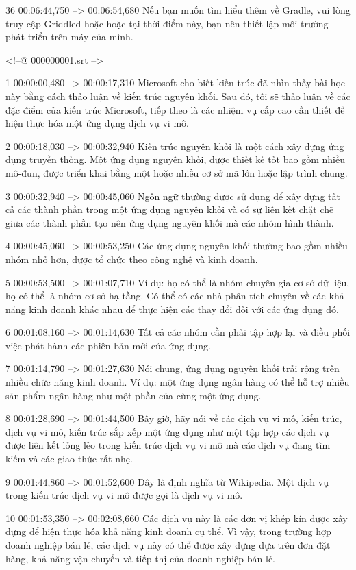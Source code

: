36
00:06:44,750 --> 00:06:54,680
Nếu bạn muốn tìm hiểu thêm về Gradle, vui lòng truy cập Griddled hoặc hoặc tại thời điểm này, bạn nên thiết lập môi trường phát triển trên máy của mình.

<!--@ 000000001.srt -->

1
00:00:00,480 --> 00:00:17,310
Microsoft cho biết kiến ​​trúc đã nhìn thấy bài học này bằng cách thảo luận về kiến ​​trúc nguyên khối.  Sau đó, tôi sẽ thảo luận về các đặc điểm của kiến ​​trúc Microsoft, tiếp theo là các nhiệm vụ cấp cao cần thiết để hiện thực hóa một ứng dụng dịch vụ vi mô.

2
00:00:18,030 --> 00:00:32,940
Kiến trúc nguyên khối là một cách xây dựng ứng dụng truyền thống.  Một ứng dụng nguyên khối, được thiết kế tốt bao gồm nhiều mô-đun, được triển khai bằng một hoặc nhiều cơ sở mã lớn hoặc lập trình chung.

3
00:00:32,940 --> 00:00:45,060
Ngôn ngữ thường được sử dụng để xây dựng tất cả các thành phần trong một ứng dụng nguyên khối và có sự liên kết chặt chẽ giữa các thành phần tạo nên ứng dụng nguyên khối mà các nhóm hình thành.

4
00:00:45,060 --> 00:00:53,250
Các ứng dụng nguyên khối thường bao gồm nhiều nhóm nhỏ hơn, được tổ chức theo công nghệ và kinh doanh.

5
00:00:53,500 --> 00:01:07,710
Ví dụ: họ có thể là nhóm chuyên gia cơ sở dữ liệu, họ có thể là nhóm cơ sở hạ tầng.
Có thể có các nhà phân tích chuyên về các khả năng kinh doanh khác nhau để thực hiện các thay đổi đối với các ứng dụng đó.

6
00:01:08,160 --> 00:01:14,630
Tất cả các nhóm cần phải tập hợp lại và điều phối việc phát hành các phiên bản mới của ứng dụng.

7
00:01:14,790 --> 00:01:27,630
Nói chung, ứng dụng nguyên khối trải rộng trên nhiều chức năng kinh doanh.  Ví dụ: một ứng dụng ngân hàng có thể hỗ trợ nhiều sản phẩm ngân hàng như một phần của cùng một ứng dụng.

8
00:01:28,690 --> 00:01:44,500
Bây giờ, hãy nói về các dịch vụ vi mô, kiến ​​trúc, dịch vụ vi mô, kiến ​​trúc sắp xếp một ứng dụng như một tập hợp các dịch vụ được liên kết lỏng lẻo trong kiến ​​trúc dịch vụ vi mô mà các dịch vụ đang tìm kiếm và các giao thức rất nhẹ.

9
00:01:44,860 --> 00:01:52,600
Đây là định nghĩa từ Wikipedia.  Một dịch vụ trong kiến ​​trúc dịch vụ vi mô được gọi là dịch vụ vi mô.

10
00:01:53,350 --> 00:02:08,660
Các dịch vụ này là các đơn vị khép kín được xây dựng để hiện thực hóa khả năng kinh doanh cụ thể.  Vì vậy, trong trường hợp doanh nghiệp bán lẻ, các dịch vụ này có thể được xây dựng dựa trên đơn đặt hàng, khả năng vận chuyển và tiếp thị của doanh nghiệp bán lẻ.

